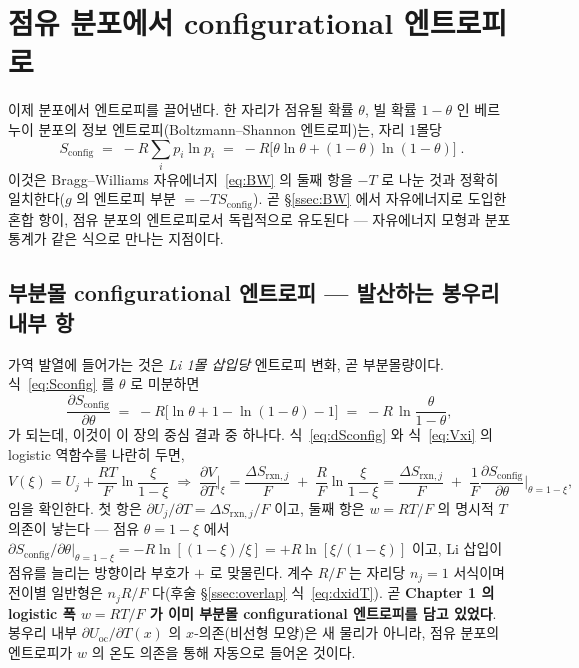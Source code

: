 \documentclass[11pt,a4paper]{article}
\newcommand{\rxn}{\mathrm{rxn}}
\newcommand{\oc}{\mathrm{oc}}
\newcommand{\config}{\mathrm{config}}
\begin{document}
\section{점유 분포에서 configurational 엔트로피로}\label{sec:config}
이제 분포에서 엔트로피를 끌어낸다. 한 자리가 점유될 확률 $\theta$, 빌 확률 $1-\theta$ 인 베르누이 분포의
정보 엔트로피(Boltzmann--Shannon 엔트로피)는, 자리 1몰당
\begin{equation}
\boxed{\;S_\config \;=\; -R\sum_i p_i\ln p_i
\;=\; -R\bigl[\theta\ln\theta + (1-\theta)\ln(1-\theta)\bigr]\;.}
\label{eq:Sconfig}
\end{equation}
이것은 Bragg--Williams 자유에너지~\eqref{eq:BW} 의 둘째 항을 $-T$ 로 나눈 것과 정확히 일치한다($g$ 의 엔트로피
부분 $=-T S_\config$). 곧 \S\ref{ssec:BW} 에서 자유에너지로 도입한 혼합 항이, 점유 분포의 엔트로피로서
독립적으로 유도된다 — 자유에너지 모형과 분포 통계가 같은 식으로 만나는 지점이다.

\subsection{부분몰 configurational 엔트로피 — 발산하는 봉우리 내부 항}
가역 발열에 들어가는 것은 \emph{Li 1몰 삽입당} 엔트로피 변화, 곧 부분몰량이다. 식~\eqref{eq:Sconfig} 를
$\theta$ 로 미분하면
\begin{equation}
\frac{\partial S_\config}{\partial\theta}
\;=\; -R\bigl[\ln\theta + 1 - \ln(1-\theta) - 1\bigr]
\;=\; -R\,\ln\!\frac{\theta}{1-\theta},
\label{eq:dSconfig}
\end{equation}
가 되는데, 이것이 이 장의 중심 결과 중 하나다. 식~\eqref{eq:dSconfig} 와 식~\eqref{eq:Vxi} 의 logistic
역함수를 나란히 두면,
\begin{equation}
V(\xi)=U_j+\frac{RT}{F}\ln\!\frac{\xi}{1-\xi}
\;\Longrightarrow\;
\frac{\partial V}{\partial T}\Big|_\xi
= \frac{\Delta S_{\rxn,j}}{F}\;+\;\frac{R}{F}\ln\!\frac{\xi}{1-\xi}
= \frac{\Delta S_{\rxn,j}}{F}\;+\;\frac{1}{F}\frac{\partial S_\config}{\partial\theta}\Big|_{\theta=1-\xi},
\label{eq:dVdT_config}
\end{equation}
임을 확인한다. 첫 항은 $\partial U_j/\partial T=\Delta S_{\rxn,j}/F$ 이고, 둘째 항은 $w=RT/F$ 의 명시적 $T$
의존이 낳는다 — 점유 $\theta=1-\xi$ 에서 $\partial S_\config/\partial\theta|_{\theta=1-\xi}=-R\ln[(1-\xi)/\xi]
=+R\ln[\xi/(1-\xi)]$ 이고, Li 삽입이 점유를 늘리는 방향이라 부호가 $+$ 로 맞물린다. 계수 $R/F$ 는 자리당
$n_j{=}1$ 서식이며 전이별 일반형은 $n_jR/F$ 다(후술 \S\ref{ssec:overlap} 식~\eqref{eq:dxidT}). 곧 \textbf{Chapter 1 의
logistic 폭 $w=RT/F$ 가 이미 부분몰 configurational 엔트로피를 담고 있었다}. 봉우리 내부 $\partial U_\oc/\partial T(x)$
의 $x$-의존(비선형 모양)은 새 물리가 아니라, 점유 분포의 엔트로피가 $w$ 의 온도 의존을 통해 자동으로 들어온 것이다.
\end{document}
